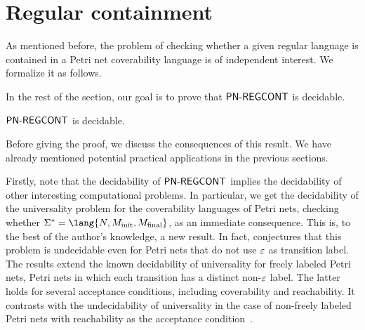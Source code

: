 \documentclass[../../diss.tex]{subfiles}
\begin{document}
\section{Regular containment}%
\label{Section:PNRegularContainment}%

As mentioned before, the problem of checking whether a given regular language is contained in a Petri net coverability language is of independent interest.
We formalize it as follows.

\begin{problem}
    \problemshort{($\PNCOVREGCONT$)}
\end{problem}

In the rest of the section, our goal is to prove that $\PNCOVREGCONT$ is decidable.

\begin{theorem}%
\label{Theorem:PNCOVRegularContainment}%
     $\PNCOVREGCONT$ is decidable.
\end{theorem}

Before giving the proof, we discuss the consequences of this result. We have already mentioned potential practical applications in the previous sections.

Firstly, note that the decidability of $\PNCOVREGCONT$ implies the decidability of other interesting computational problems.
In particular, we get the decidability of the universality problem for the coverability languages of Petri nets, \ie checking whether $\Sigma^* = \lang{N,\Minit,\Mfinal}$, as an immediate consequence.
This is, to the best of the author's knowledge, a new result.
In fact,  conjectures that this problem is undecidable even for Petri nets that do not use $\varepsilon$ as transition label.
The results extend the known decidability of universality for freely labeled Petri nets, \ie Petri nets in which each transition has a distinct non-$\varepsilon$ label.
The latter holds for several acceptance conditions, including coverability and reachability.
It contrasts with the undecidability of universality in the case of non-freely labeled Petri nets with reachability as the acceptance condition~\cite{Wimmel08}.
\end{document}
